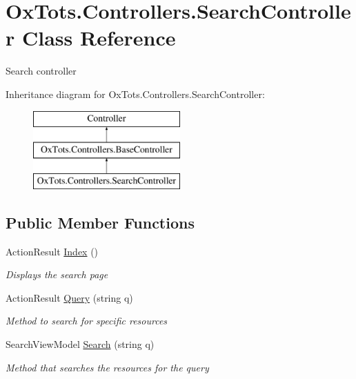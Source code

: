 \hypertarget{class_ox_tots_1_1_controllers_1_1_search_controller}{}\section{Ox\+Tots.\+Controllers.\+Search\+Controller Class Reference}
\label{class_ox_tots_1_1_controllers_1_1_search_controller}


Search controller  


Inheritance diagram for Ox\+Tots.\+Controllers.\+Search\+Controller\+:\begin{figure}[H]
\begin{center}
\leavevmode
\includegraphics[height=3.000000cm]{class_ox_tots_1_1_controllers_1_1_search_controller}
\end{center}
\end{figure}
\subsection*{Public Member Functions}
\begin{DoxyCompactItemize}
\item 
Action\+Result \mbox{\hyperlink{class_ox_tots_1_1_controllers_1_1_search_controller_a53611fc0cd421bce0a04ed1dfe6a8780}{Index}} ()
\begin{DoxyCompactList}\small\item\em Displays the search page \end{DoxyCompactList}\item 
Action\+Result \mbox{\hyperlink{class_ox_tots_1_1_controllers_1_1_search_controller_a4c64133bbd7e03d9d2ca047d09fa0f82}{Query}} (string q)
\begin{DoxyCompactList}\small\item\em Method to search for specific resources \end{DoxyCompactList}\item 
Search\+View\+Model \mbox{\hyperlink{class_ox_tots_1_1_controllers_1_1_search_controller_a280d4f9b78f3ec664bee0cf52b7d68e1}{Search}} (string q)
\begin{DoxyCompactList}\small\item\em Method that searches the resources for the query \end{DoxyCompactList}\end{DoxyCompactItemize}
